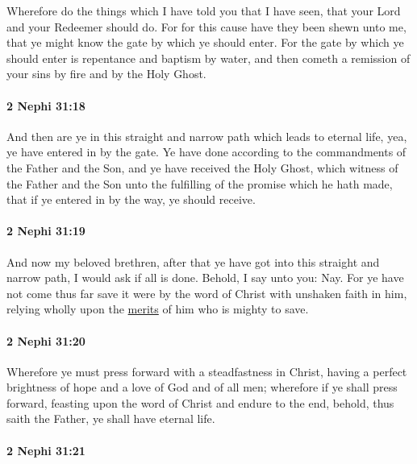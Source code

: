 			Wherefore do the things which I have told you that I have seen,
			that your Lord and your Redeemer should do.
			For for this cause have they been shewn unto me,
			that ye might know the gate by which ye should enter.
			For the gate by which ye should enter is repentance and baptism by water,
			and then cometh a remission of your sins by fire and by the Holy Ghost.

		\paragraph{2 Nephi 31:18} %
			\label{2NEPHI-31-18}

			And then are ye in this straight and narrow path which leads to eternal life,
			yea, ye have entered in by the gate.
			Ye have done according to the commandments of the Father and the Son,
			and ye have received the Holy Ghost, which witness of the Father and the Son
			unto the fulfilling of the promise which he hath made,
			that if ye entered in by the way,
			ye should receive.

		\paragraph{2 Nephi 31:19} %
			\label{2NEPHI-31-19}

			And now my beloved brethren,
			after that ye have got into this straight and narrow path,
			I would ask if all is done.
			Behold, I say unto you: Nay.
			For ye have not come thus far
			save it were by the word of Christ with unshaken faith in him,
			relying wholly upon the \hyperref[MERIT]{merits} of him who is mighty to save.

		\paragraph{2 Nephi 31:20} %
			\label{2NEPHI-31-20}

			Wherefore ye must press forward with a steadfastness in Christ,
			having a perfect brightness of hope and a love of God and of all men;
			wherefore if ye shall press forward,
			feasting upon the word of Christ
			and endure to the end,
			behold, thus saith the Father,
			ye shall have eternal life.

		\paragraph{2 Nephi 31:21} %
			\label{2NEPHI-31-21}

